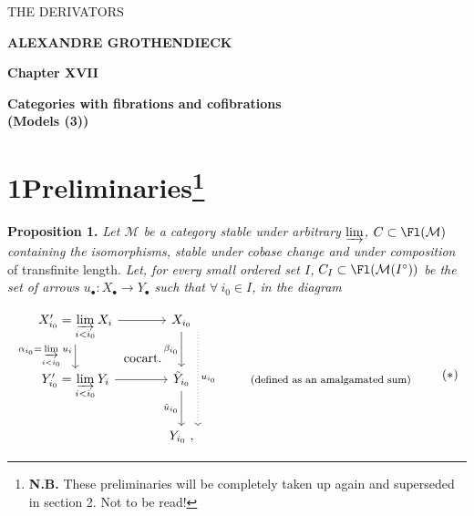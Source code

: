 \printedpage{--}

\begin{center}
\vspace*{5cm}

{\Large\textsf{THE DERIVATORS}}

\bigskip

\textbf{ALEXANDRE GROTHENDIECK}

\vspace{2cm}

\textbf{Chapter XVII}

\medskip

\textbf{Categories with fibrations and cofibrations}\\
\textbf{(Models (3))}
\end{center}

\clearpage

\printedpage{--}

\vspace*{5cm}


\clearpage



\section*{1\quad Preliminaries\footnote{\textbf{N.B.} These preliminaries will be completely taken up again and superseded in section 2. Not to be read!}}

\textbf{Proposition 1.} \textit{Let $\mathcal{M}$ be a category stable under arbitrary $\varinjlim$, $C \subset \Fl(\mathcal{M})$ containing the isomorphisms, stable under cobase change and under composition} of transfinite length. \textit{Let, for every small ordered set $I$, $C_I \subset \Fl(\mathcal{M}(I^{\circ}))$ be the set of arrows $u_\bullet : X_\bullet \longrightarrow Y_\bullet$ such that $\forall\ i_0 \in I$, in the diagram} %

\[
\begin{tikzcd}[column sep=large]
X'_{i_0} = \varinjlim\limits_{i<i_0} X_i \arrow[r] \arrow[d, "\alpha_{i_0} = \varinjlim\limits_{i<i_0} u_i"'] \arrow[dr, phantom, "\text{cocart.}"] & X_{i_0} \arrow[d, "\beta_{i_0}"'] \arrow[dd, dotted, shift left=3ex, "u_{i_0}"] & \\
Y'_{i_0} = \varinjlim\limits_{i<i_0} Y_i \arrow[r] & \tilde{Y}_{i_0} \arrow[d, "\tilde{u}_{i_0}"'] & \text{\footnotesize (defined as an amalgamated sum)} \\
& Y_{i_0}\ , &
\end{tikzcd}
\tag*{$(*)$}
\]

